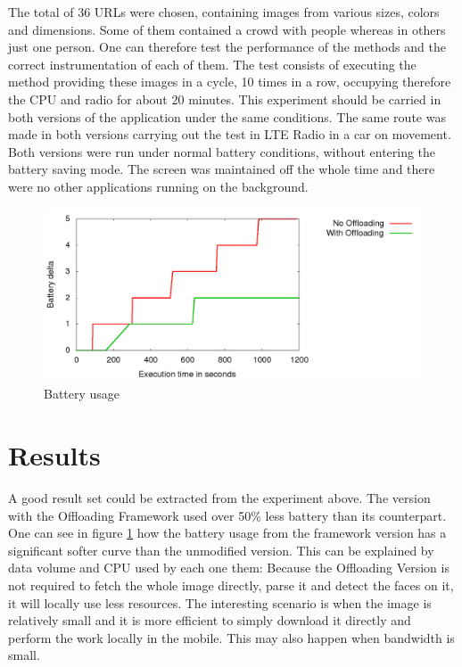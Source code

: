 \documentclass[10pt, conference, letterpaper]{IEEEtran}
\begin{document}
  The total of 36 URLs were chosen, containing images from various sizes, colors and dimensions. Some of them contained a crowd with people whereas in others just one person. One can therefore test the performance of the methods and the correct instrumentation of each of them. The test consists of executing the method providing these images in a cycle, 10 times in a row, occupying therefore the CPU and radio for about 20 minutes. This experiment should be carried in both versions of the application under the same conditions. The same route was made in both versions carrying out the test in LTE Radio in a car on movement. Both versions were run under normal battery conditions, without entering the battery saving mode. The screen was maintained off the whole time and there were no other applications running on the background.

\begin{figure}[!t]
  \centering
  \includegraphics[width=1\textwidth]{results/plots/executions.png}
  \caption{Battery usage}
  \label{fig:batteryusage}
\end{figure}

  \section{Results}

  A good result set could be extracted from the experiment above. The version with the Offloading Framework used over 50\% less battery than its counterpart. One can see in figure \ref{fig:batteryusage} how the battery usage from the framework version has a significant softer curve than the unmodified version. This can be explained by data volume and CPU used by each one them: Because the Offloading Version is not required to fetch the whole image directly, parse it and detect the faces on it, it will locally use less resources. The interesting scenario is when the image is relatively small and it is more efficient to simply download it directly and perform the work locally in the mobile. This may also happen when bandwidth is small.
\end{document}
